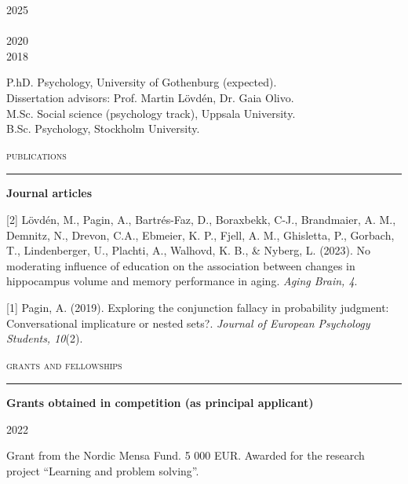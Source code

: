 \documentclass[11pt]{article}
\newcommand{\RR}{\textcolor{grayrule}{\rule[3mm]{\textwidth}{0.5pt}}}
\begin{document}
\begin{minipage}[t]{0.075\linewidth}
2025 \\ \\
2020 \\ 
2018
\end{minipage} 
\begin{minipage}[t]{0.92\linewidth}P.hD. Psychology, University of Gothenburg (expected).\\ 
{\footnotesize Dissertation advisors: Prof. Martin Lövdén, Dr. Gaia Olivo.} \\
M.Sc. Social science (psychology track), Uppsala University. \\
\normalsize B.Sc. Psychology, Stockholm University. \\
\end{minipage}

\textsc{\Large publications} \\
\vspace{-.3cm}\RR 

\textbf{Journal articles}

\begin{hangparas}{0.4in}{1}
\vspace{-0.6em}
[2] Lövdén, M., Pagin, A., Bartrés-Faz, D., Boraxbekk, C-J., Brandmaier, A. M., Demnitz, N., Drevon, C.A., Ebmeier, K. P., Fjell, A. M., Ghisletta, P., Gorbach, T., Lindenberger, U., Plachti, A., Walhovd, K. B., \& Nyberg, L. (2023). No moderating influence of education on the association between changes in hippocampus volume and memory performance in aging. \emph{Aging Brain, 4}. %

[1] Pagin, A. (2019). Exploring the conjunction fallacy in probability judgment: Conversational implicature or nested sets?. \emph{Journal of European Psychology Students, 10}(2). \\
\end{hangparas}

\textsc{\Large grants and fellowships}\\
\vspace{-.3cm}\RR 

\textbf{Grants obtained in competition (as principal applicant)}

\vspace{-0.6em}
\begin{minipage}[t]{0.075\linewidth}
2022 
\end{minipage} 
\begin{minipage}[t]{0.92\linewidth}Grant from the Nordic Mensa Fund. 5 000 EUR. Awarded for the research project \enquote{Learning and problem solving}. \vspace{\baselineskip}
\end{minipage}
\end{document}
